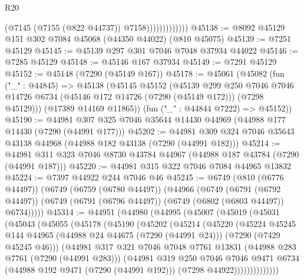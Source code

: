 \begin{lexlean}{R20}
\begin{coremodule}
{                            (@7145 (@7155 (@822 @44737)) @7158)))))))))))))
@45138 := @8092 @45129 @151 @302 @7084 @45068 (@44350 @44022) (@810 @45075)
@45139 := @7251 @45129
@45145 := @45139 @297 @301 @7046 @7048 @37934 @44022
@45146 := @7285 @45129
@45148 := @45146 @167 @37934
@45149 := @7291 @45129
@45152 := @45148 (@7290 (@45149 @167))
@45178 := @45061
    (@45082
      (fun ("_" : @44845) =>
      @45138
        (@45145
          @45152
          (@45139
            @299
            @250
            @7046
            @7046
            @14726
            @6734
            (@45146 @172 @14726 (@7290 (@45149 @172)))
            (@7298 @45129)))
        (@17389 @14169 @11865))
      (fun ("_" : @44844 @7222) => @45152))
@45190 := @44981 @307 @325 @7046 @35644 @14430 @44969 (@44988 @177 @14430 (@7290 (@44991 @177)))
@45202 := @44981 @309 @324 @7046 @35643 @43138 @44968 (@44988 @182 @43138 (@7290 (@44991 @182)))
@45214 := @44981 @311 @323 @7046 @8730 @43784 @44967 (@44988 @187 @43784 (@7290 (@44991 @187)))
@45220 := @44981 @315 @322 @7046 @7084 @44965 @13832
@45224 := @7397 @44922 @244 @7046 @46
@45245 := @6749
    (@810 (@6776 @44497))
    (@6749
      (@6759 (@6780 @44497))
      (@44966
        (@6749
          (@6791 (@6792 @44497))
          (@6749 (@6791 (@6796 @44497)) (@6749 (@6802 (@6803 @44497)) @6734)))))
@45314 := @44951
    (@44980
      (@44995
        (@45007
          (@45019
            (@45031
              (@45043
                (@45055
                  (@45178
                    (@45190
                      (@45202
                        (@45214
                          (@45220
                            (@45224
                              @45245
                              @144
                              @44965
                              (@44988 @24 @44675 (@7290 (@44991 @24)))
                              (@7290 (@7429 @45245 @46)))
                            (@44981
                              @317
                              @321
                              @7046
                              @7048
                              @7761
                              @13831
                              (@44988 @283 @7761 (@7290 (@44991 @283)))
                              (@44981
                                @319
                                @250
                                @7046
                                @7046
                                @9471
                                @6734
                                (@44988 @192 @9471 (@7290 (@44991 @192)))
                                (@7298 @44922))))))))))))))
}
\end{coremodule}
\end{lexlean}
